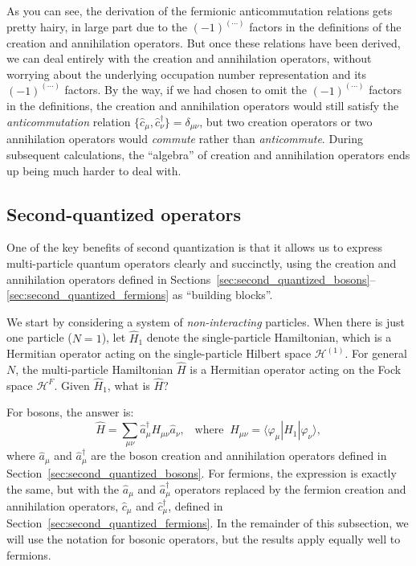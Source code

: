 \documentclass[pra,12pt]{revtex4}
\begin{document}
As you can see, the derivation of the fermionic anticommutation
relations gets pretty hairy, in large part due to the
$(-1)^{(\cdots)}$ factors in the definitions of the creation and
annihilation operators.  But once these relations have been derived,
we can deal entirely with the creation and annihilation operators,
without worrying about the underlying occupation number representation
and its $(-1)^{(\cdots)}$ factors.  By the way, if we had chosen to
omit the $(-1)^{(\cdots)}$ factors in the definitions, the creation
and annihilation operators would still satisfy the
\textit{anticommutation} relation
$\{\hat{c}_\mu,\hat{c}_\nu^\dagger\}=\delta_{\mu\nu}$, but two
creation operators or two annihilation operators would
\textit{commute} rather than \textit{anticommute}.  During subsequent
calculations, the ``algebra'' of creation and annihilation operators
ends up being much harder to deal with.

\subsection{Second-quantized operators}
\label{sec:second_quant_op}

One of the key benefits of second quantization is that it allows us to
express multi-particle quantum operators clearly and succinctly, using
the creation and annihilation operators defined in
Sections~\ref{sec:second_quantized_bosons}--\ref{sec:second_quantized_fermions}
as ``building blocks''.

We start by considering a system of \textit{non-interacting}
particles.  When there is just one particle ($N=1$), let $\hat{H}_1$
denote the single-particle Hamiltonian, which is a Hermitian operator
acting on the single-particle Hilbert space $\mathscr{H}^{(1)}$.  For
general $N$, the multi-particle Hamiltonian $\hat{H}$ is a Hermitian
operator acting on the Fock space $\mathscr{H}^F$.  Given $\hat{H}_1$,
what is $\hat{H}$?

For bosons, the answer is:
\begin{equation}
  \hat{H} = \sum_{\mu\nu} \hat{a}^\dagger_\mu H_{\mu\nu} \hat{a}_\nu, \;\;\; \mathrm{where}\;\; H_{\mu\nu} = \langle\varphi_\mu|\hat{H}_1|\varphi_\nu\rangle,
\end{equation}
where $\hat{a}_\mu$ and $\hat{a}_\mu^\dagger$ are the boson creation
and annihilation operators defined in
Section~\ref{sec:second_quantized_bosons}.  For fermions, the
expression is exactly the same, but with the $\hat{a}_\mu$ and
$\hat{a}_\mu^\dagger$ operators replaced by the fermion creation and
annihilation operators, $\hat{c}_\mu$ and $\hat{c}_\mu^\dagger$,
defined in Section~\ref{sec:second_quantized_fermions}.  In the
remainder of this subsection, we will use the notation for bosonic
operators, but the results apply equally well to fermions.
\end{document}
